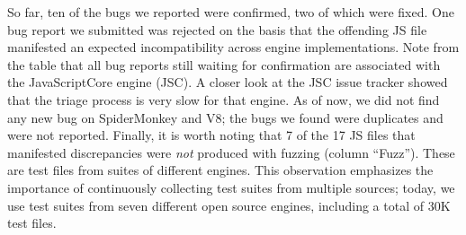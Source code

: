 \documentclass[10pt,conference,anonymous]{IEEEtran}
\begin{document}
So far, ten of the bugs we reported
were confirmed, two of which were fixed. One bug report we
submitted was rejected on the basis that the offending JS file
manifested an expected incompatibility across engine
implementations.
Note from the table that all bug
reports still waiting for confirmation are associated with the
JavaScriptCore engine (JSC). A closer look at the JSC issue tracker
showed that the triage process is very slow for that engine. As of
now, we did not find any new bug on SpiderMonkey and V8; the bugs we
found were duplicates and were not reported. Finally, it is
worth noting that 7 of the 17 JS files that manifested
discrepancies were \emph{not} produced with fuzzing (column
``Fuzz''). These are test files from suites of different engines. This
observation emphasizes the importance of continuously collecting test suites from
multiple sources; today, we use test suites from seven different open
source engines, including a total of 30K test files.


%


\end{document}
